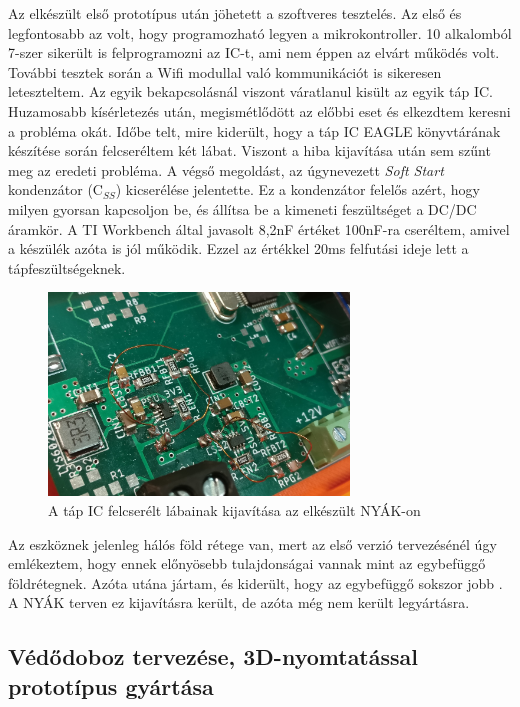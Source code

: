 \documentclass[../main.tex]{subfiles}
\begin{document}
        Az elkészült első prototípus után jöhetett a szoftveres tesztelés. Az első és legfontosabb az volt, hogy programozható legyen a mikrokontroller. 10 alkalomból 7-szer sikerült is felprogramozni az IC-t, ami nem éppen az elvárt működés volt. További tesztek során a Wifi modullal való kommunikációt is sikeresen leteszteltem. Az egyik bekapcsolásnál viszont váratlanul kisült az egyik táp IC. Huzamosabb kísérletezés után, megismétlődött az előbbi eset és elkezdtem keresni a probléma okát. Időbe telt, mire kiderült, hogy a táp IC EAGLE könyvtárának készítése során felcseréltem két lábat. Viszont a hiba kijavítása után sem szűnt meg az eredeti probléma. A végső megoldást, az úgynevezett \textit{Soft Start} kondenzátor (C$_{SS}$) kicserélése jelentette. Ez a kondenzátor felelős azért, hogy milyen gyorsan kapcsoljon be, és állítsa be a kimeneti feszültséget a DC/DC áramkör\cite{ds_tps56}. A TI Workbench által javasolt 8,2nF értéket 100nF-ra cseréltem, amivel a készülék azóta is jól működik. Ezzel az értékkel 20ms felfutási ideje lett a tápfeszültségeknek.
        
        \begin{figure}[h!]
            \centering
                \includegraphics[width=8cm]{resources/pcb_res/pcb_psu_lib_fail}
            \caption{A táp IC felcserélt lábainak kijavítása az elkészült NYÁK-on}
            \label{fig:pcb_psu_fail}
        \end{figure}
        
        Az eszköznek jelenleg hálós föld rétege van, mert az első verzió tervezésénél úgy emlékeztem, hogy ennek előnyösebb tulajdonságai vannak mint az egybefüggő földrétegnek. Azóta utána jártam, és kiderült, hogy az egybefüggő sokszor jobb \cite{ground_planes}. A NYÁK terven ez kijavításra került, de azóta még nem került legyártásra.
        
    \subsection{Védődoboz tervezése, 3D-nyomtatással prototípus gyártása}
    
\end{document}
